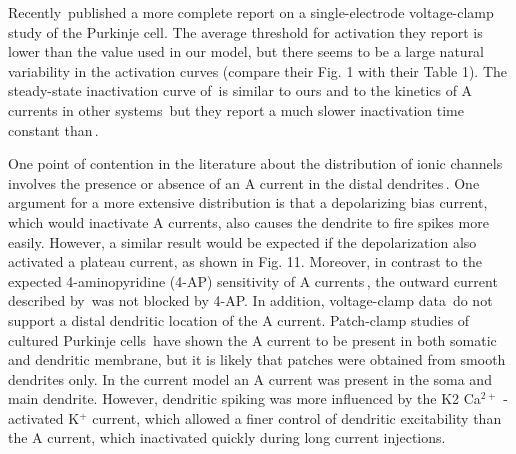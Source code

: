 \documentclass[12pt]{article}
\begin{document}
Recently\,\cite{Wang:1991bs} published a more complete report on a single-electrode voltage-clamp study of the Purkinje cell. The average threshold for activation they report is lower than the value used in our model, but there seems to be a large natural variability in the activation curves (compare their Fig. 1 with their Table 1). The steady-state inactivation curve of\,\cite{Wang:1991bs} is similar to ours and to the kinetics of A currents in other systems\,\cite{Connor:1971tg, Rogawski:1985fv} but they report a much slower inactivation time constant than\,\cite{Hirano:1989uq}.

One point of contention in the literature about the 
distribution of ionic channels involves the presence
or absence of an A current in the distal dendrites\,\cite{Chan:1988fk, Hounsgaard:1988nx}.
One argument for a more extensive distribution is that a depolarizing
bias current, which would inactivate A currents,
also causes the dendrite to fire spikes more easily. However,
a similar result would be expected if the depolarization also
activated a plateau current, as shown in Fig. 11. Moreover,
in contrast to the expected 4-aminopyridine (4-AP) sensitivity
of A currents\,\cite{Rogawski:1985fv}, the outward current
described by\,\cite{Hounsgaard:1988nx} was not
blocked by 4-AP. In addition, voltage-clamp data\,\cite{Wang:1991bs} 
do not support a distal dendritic location of the A
current. Patch-clamp studies of cultured Purkinje cells\,\cite{Gruol:1991dz}
have shown the A current to be present
in both somatic and dendritic membrane, but it is likely
that patches were obtained from smooth dendrites only. In
the current model an A current was present in the soma and
main dendrite. However, dendritic spiking was more influenced
by the K2 Ca$^{2+}$ -activated K$^+$ current, which allowed
a finer control of dendritic excitability than the A
current, which inactivated quickly during long current injections.



\end{document}
